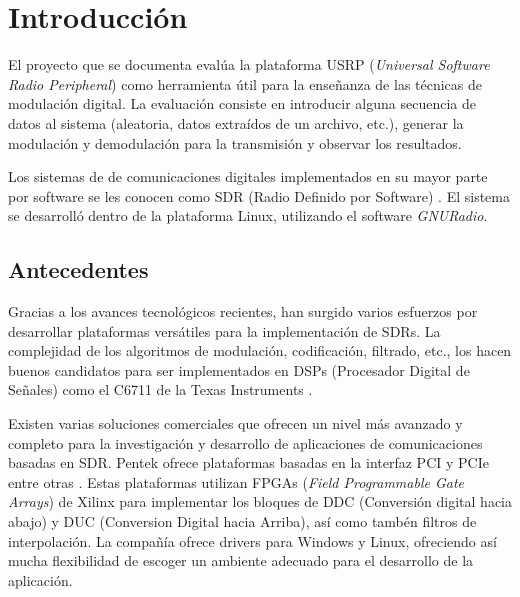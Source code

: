 \chapter{Introducci\'on}

El proyecto que se documenta eval\'ua la plataforma USRP (\emph{Universal Software Radio Peripheral}) como herramienta \'util
para la ense\~nanza de las t\'ecnicas de modulaci\'on digital. La evaluaci\'on consiste en introducir alguna secuencia de
datos al sistema (aleatoria, datos extra\'idos de un archivo, etc.), generar la modulaci\'on y demodulaci\'on para la
transmisi\'on y observar los resultados.

Los sistemas de de comunicaciones digitales implementados en su  mayor parte por software se les conocen como SDR (Radio
Definido por Software) \cite{mitola}. El sistema se desarroll\'o dentro de la plataforma Linux, utilizando el software
\emph{GNURadio}.

\section{Antecedentes}

Gracias a los avances tecnol\'ogicos recientes, han surgido varios esfuerzos por desarrollar plataformas vers\'atiles para
la implementaci\'on de SDRs. La complejidad de los algoritmos de modulaci\'on, codificaci\'on, filtrado, etc., los hacen buenos
candidatos para ser implementados en DSPs (Procesador Digital de Se\~nales) como el C6711 de la Texas Instruments
\cite{abendroth}.

Existen varias soluciones comerciales que ofrecen un nivel m\'as avanzado y completo para la investigaci\'on y desarrollo de
aplicaciones de comunicaciones basadas en SDR. Pentek ofrece plataformas basadas en la interfaz PCI y PCIe entre otras
\cite{pentek}. Estas plataformas utilizan FPGAs (\emph{Field Programmable Gate Arrays}) de Xilinx para implementar los
bloques de DDC (Conversi\'on digital hacia abajo) y DUC (Conversion Digital hacia Arriba), as\'i como tamb\'en filtros de
interpolaci\'on. La compa\~n\'ia ofrece drivers para Windows y Linux, ofreciendo as\'i mucha flexibilidad de escoger un
ambiente adecuado para el desarrollo de la aplicaci\'on.


